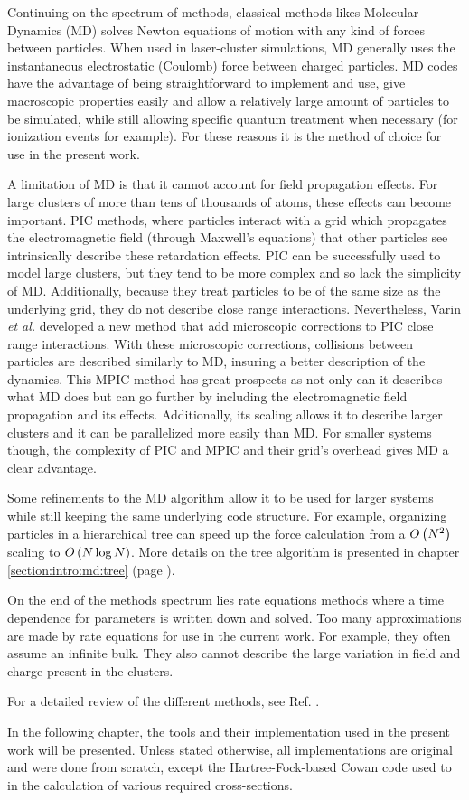 Continuing on the spectrum of methods, classical methods likes Molecular
Dynamics (MD) solves Newton
equations of motion with any kind of forces between particles\cite{Skeel1998}.
When used in
laser-cluster simulations, MD generally uses the instantaneous electrostatic
(Coulomb) force between charged particles. MD codes have the advantage of being
straightforward to implement and use, give macroscopic properties easily and allow a
relatively large amount of particles to be simulated, while still allowing
specific quantum treatment when necessary (for ionization events for example). For
these reasons it is the method of choice for use in the present work.

A limitation of MD is that it cannot account for field propagation effects. For
large clusters of more than tens of thousands of atoms, these effects can become
important. PIC methods, where particles interact with a grid which propagates the
electromagnetic field (through Maxwell's equations) that other particles see
intrinsically describe these retardation effects. PIC can be successfully used
to model large clusters, but they tend to be more complex and so lack the
simplicity of MD. Additionally, because they treat particles to be of the same
size as the underlying grid, they do not describe close range interactions.
Nevertheless, Varin \textit{et al.} developed a new method that add microscopic
corrections to PIC close range interactions\cite{Varin2012}. With these microscopic
corrections, collisions between particles are described similarly to MD, insuring
a better description of the dynamics. This MPIC method has great prospects
as not only can it describes what MD does but can go further by including the
electromagnetic field propagation and its effects. Additionally, its scaling
allows it to describe larger clusters and it can be parallelized more easily
than MD. For smaller systems though, the complexity of PIC and MPIC and their
grid's overhead gives MD a clear advantage.

Some refinements to the MD algorithm allow it to be used for larger systems
while still keeping the same underlying code structure. For example, organizing
particles in a hierarchical tree\cite{Barnes1986,Gibbon2002} can speed up the force
calculation from a $O\left( N^2 \right)$ scaling to $O\left( N \log{N} \right)$. More details on the
tree algorithm is presented in chapter \ref{section:intro:md:tree} (page
\pageref{section:intro:md:tree}).

On the end of the methods spectrum lies rate equations methods where a time
dependence for parameters is written down and solved. Too many approximations
are made by rate equations for use in the current work. For example, they often
assume an infinite bulk. They also cannot describe the large variation in field
and charge present in the clusters.

For a detailed review of the different methods, see Ref. \cite{Fennel2010}.

In the following chapter, the tools and their implementation used in the present
work will be presented. Unless stated otherwise, all implementations are original
and were done from scratch, except the Hartree-Fock-based Cowan code\cite{CowanCode} used to
in the calculation of various required cross-sections.


